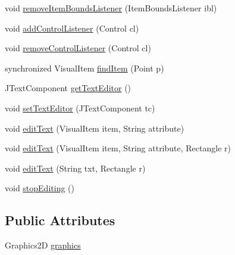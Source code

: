 \begin{DoxyCompactItemize}
\item 
void \hyperlink{classprefuse_1_1_display_a092ec1921c7ab89559f3957dbd81b5b9}{remove\-Item\-Bounds\-Listener} (\-Item\-Bounds\-Listener ibl)
\item 
void \hyperlink{classprefuse_1_1_display_a5dbf3c1ca016ae968fd80b141834b894}{add\-Control\-Listener} (\-Control cl)
\item 
void \hyperlink{classprefuse_1_1_display_ac574997eb21fef4c2f2a6098da6c698d}{remove\-Control\-Listener} (\-Control cl)
\item 
synchronized \-Visual\-Item \hyperlink{classprefuse_1_1_display_ab323d3e8b4552599490ba2fcc6067f94}{find\-Item} (\-Point p)
\item 
\-J\-Text\-Component \hyperlink{classprefuse_1_1_display_a7328a5071f4f672b9bbd8f1d1b0f82ab}{get\-Text\-Editor} ()
\item 
void \hyperlink{classprefuse_1_1_display_a63c4a46117591c6785116f2e86217978}{set\-Text\-Editor} (\-J\-Text\-Component tc)
\item 
void \hyperlink{classprefuse_1_1_display_a16b51d77ce8e53bcb2bd3c0cd5e4b331}{edit\-Text} (\-Visual\-Item item, \-String attribute)
\item 
void \hyperlink{classprefuse_1_1_display_a96213104a161d10d05bfc7614bf8f4f0}{edit\-Text} (\-Visual\-Item item, \-String attribute, \-Rectangle r)
\item 
void \hyperlink{classprefuse_1_1_display_a36ababbdd78593a097f9f054f813b232}{edit\-Text} (\-String txt, \-Rectangle r)
\item 
void \hyperlink{classprefuse_1_1_display_a8dd4a897585b2f808173575a41e4aeda}{stop\-Editing} ()
\end{DoxyCompactItemize}
\subsection*{\-Public \-Attributes}
\begin{DoxyCompactItemize}
\item 
\-Graphics2\-D \hyperlink{classprefuse_1_1_display_a02d52d9a40bcab537256716076de706b}{graphics}
\end{DoxyCompactItemize}
